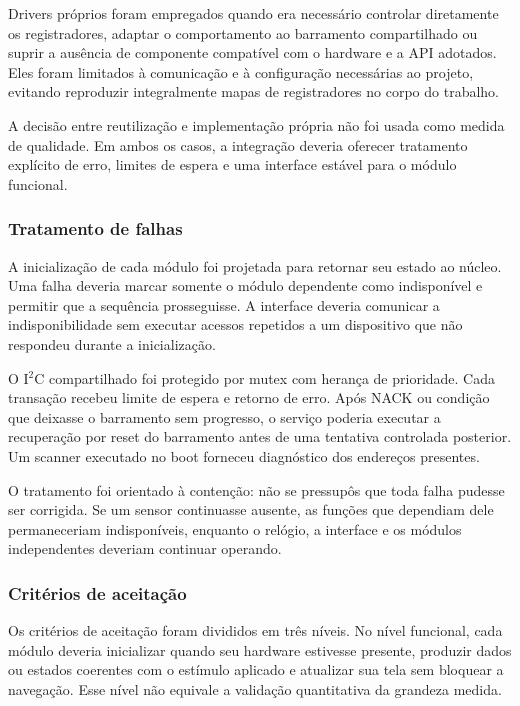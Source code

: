 \documentclass[a4paper,12pt]{article}
\begin{document}
Drivers pr\'oprios foram empregados quando era necess\'ario controlar diretamente os registradores, adaptar o comportamento ao barramento compartilhado ou suprir a aus\^encia de componente compat\'ivel com o hardware e a API adotados. Eles foram limitados \`a comunica\c{c}\~ao e \`a configura\c{c}\~ao necess\'arias ao projeto, evitando reproduzir integralmente mapas de registradores no corpo do trabalho.


A decis\~ao entre reutiliza\c{c}\~ao e implementa\c{c}\~ao pr\'opria n\~ao foi usada como medida de qualidade. Em ambos os casos, a integra\c{c}\~ao deveria oferecer tratamento expl\'icito de erro, limites de espera e uma interface est\'avel para o m\'odulo funcional.


\subsubsection{Tratamento de falhas}


A inicializa\c{c}\~ao de cada m\'odulo foi projetada para retornar seu estado ao n\'ucleo. Uma falha deveria marcar somente o m\'odulo dependente como indispon\'ivel e permitir que a sequ\^encia prosseguisse. A interface deveria comunicar a indisponibilidade sem executar acessos repetidos a um dispositivo que n\~ao respondeu durante a inicializa\c{c}\~ao.


O I$^2$C compartilhado foi protegido por mutex com heran\c{c}a de prioridade. Cada transa\c{c}\~ao recebeu limite de espera e retorno de erro. Ap\'os NACK ou condi\c{c}\~ao que deixasse o barramento sem progresso, o servi\c{c}o poderia executar a recupera\c{c}\~ao por reset do barramento antes de uma tentativa controlada posterior. Um scanner executado no boot forneceu diagn\'ostico dos endere\c{c}os presentes.


O tratamento foi orientado \`a conten\c{c}\~ao: n\~ao se pressup\^os que toda falha pudesse ser corrigida. Se um sensor continuasse ausente, as fun\c{c}\~oes que dependiam dele permaneceriam indispon\'iveis, enquanto o rel\'ogio, a interface e os m\'odulos independentes deveriam continuar operando.


\subsubsection{Crit\'erios de aceita\c{c}\~ao}


Os crit\'erios de aceita\c{c}\~ao foram divididos em tr\^es n\'iveis. No n\'ivel funcional, cada m\'odulo deveria inicializar quando seu hardware estivesse presente, produzir dados ou estados coerentes com o est\'imulo aplicado e atualizar sua tela sem bloquear a navega\c{c}\~ao. Esse n\'ivel n\~ao equivale a valida\c{c}\~ao quantitativa da grandeza medida.
\end{document}
